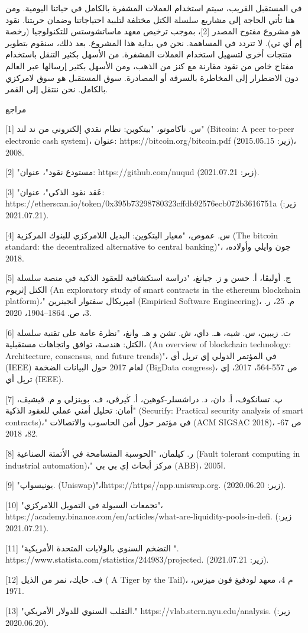 في المستقبل القريب، سيتم استخدام العملات المشفرة بالكامل في حياتنا اليومية. ومن هنا تأتي الحاجة إلى مشاريع سلسلة الكتل مختلفة لتلبية احتياجاتنا وضمان حريتنا. نقود هو مشروع مفتوح المصدر [2]، بموجب ترخيص معهد ماساتشوستس للتكنولوجيا (رخصة إم أي تي). لا تتردد في المساهمة. نحن في بداية هذا المشروع. بعد ذلك، سنقوم بتطوير منتجات أخرى لتسهيل استخدام العملات المشفرة. من الأسهل بكثير التنقل باستخدام مفتاح خاص من نقود مقارنة مع كنز من الذهب، ومن الأسهل بكثير إرسالها عبر العالم دون الاضطرار إلى المخاطرة بالسرقة أو المصادرة. سوق المستقبل هو سوق لامركزي بالكامل. نحن ننتقل إلى القمر.


مراجع


[1] س. ناكاموتو، "بيتكوين: نظام نقدي إلكتروني من ند لند" (Bitcoin: A peer to-peer electronic cash system)، عنوان: https://bitcoin.org/bitcoin.pdf (زير: 2015.05.15)، 2008.


[2] "مستودع نقود"، عنوان: https://github.com/nuqud (زير: 2021.07.21).


[3] "عَقد نقود الذكي"، عنوان:
https://etherscan.io/token/0x395b73298780323cffdb92576ecb072b3616751a 
(زير: 2021.07.21).


[4] س. عموص، "معيار البتكوين: البديل اللامركزي للبنوك المركزية (The bitcoin standard: the decentralized alternative to central banking)"، جون وايلي وأولاده، 2018.


[5] ج. أوليڤا، أ. حسن و ز. جيانغ، "دراسة استكشافية للعقود الذكية في منصة سلسلة الكتل إثريوم (An exploratory study of smart contracts in the ethereum blockchain platform)،" امپريكال سفتوار انجينرين (Empirical Software Engineering)، م. 25، ر. 3، ص. 1864–1904، 2020.


[6] ت. زيبين، س. شيه، هـ. داي، ش. تشن و هـ. وانغ، "نظرة عامة على تقنية سلسلة الكتل: هندسة، توافق واتجاهات مستقبلية، (An overview of blockchain technology: Architecture, consensus, and future trends)"، في المؤتمر الدولي إي ترپل أي (IEEE) لعام 2017 حول البيانات الضخمة (BigData congress)، ص 557-564، 2017، إي ترپل أي (IEEE).


[7] پ. تسانكوف، أ. دان، د. دراشسلر-كوهين، أ. ڭيرڤي، ف. بوينزلي و م. ڤيشيڤ، "أمان: تحليل أمني عملي للعقود الذكية (Securify: Practical security analysis of smart contracts)،" في مؤتمر حول أمن الحاسوب والاتصالات (ACM SIGSAC 2018)، ص 67-82، 2018.


[8] ر. كيلمان، "الحوسبة المتسامحة في الأتمتة الصناعية (Fault tolerant computing in industrial automation)،" مركز أبحاث إي بي بي (ABB)، ا2005.


[9]  "يونيسواپ. (Uniswap)"،اhttps://https//app.uniswap.org. (زير: 2020.06.20).


[10] "تجمعات السيولة في التمويل اللامركزي"،
https://academy.binance.com/en/articles/what-are-liquidity-pools-in-defi.
(زير: 2021.07.21).


[11] "التضخم السنوي بالولايات المتحدة الأمريكية ".
 https://www.statista.com/statistics/244983/projected. (زير: 2021.07.21).


[12] ف. حايك، نمر من الذيل ( A Tiger by the Tail)، م 4، معهد لودفيغ فون ميزس، 1971.


[13] "التقلب السنوي للدولار الأمريكي." https://vlab.stern.nyu.edu/analysis. (زير: 2020.06.20).